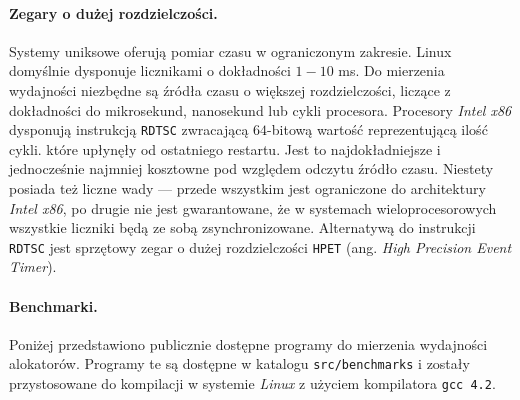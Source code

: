 \documentclass[12pt,a4paper,titlepage,twoside]{mwart}
\begin{document}
\paragraph{Zegary o dużej rozdzielczości.} Systemy uniksowe oferują pomiar
czasu w ograniczonym zakresie. Linux domyślnie dysponuje licznikami o
dokładności $1-10$ ms. Do mierzenia wydajności niezbędne są źródła czasu o
większej rozdzielczości, liczące z dokładności do mikrosekund, nanosekund lub
cykli procesora. Procesory \textit{Intel x86} dysponują instrukcją
\texttt{RDTSC} zwracającą $64$-bitową wartość reprezentującą ilość cykli.
które upłynęły od ostatniego restartu. Jest to najdokładniejsze i jednocześnie
najmniej kosztowne pod względem odczytu źródło czasu. Niestety posiada też
liczne wady --- przede wszystkim jest ograniczone do architektury \textit{Intel
x86}, po drugie nie jest gwarantowane, że w systemach wieloprocesorowych
wszystkie liczniki będą ze sobą zsynchronizowane. Alternatywą do instrukcji
\texttt{RDTSC} jest sprzętowy zegar o dużej rozdzielczości \texttt{HPET} (ang.
\textit{High Precision Event Timer}).

\paragraph{Benchmarki.} Poniżej przedstawiono publicznie dostępne programy do
mierzenia wydajności alokatorów. Programy te są dostępne w katalogu
\texttt{src/benchmarks} i zostały przystosowane do kompilacji w systemie
\textit{Linux} z użyciem kompilatora \texttt{gcc 4.2}.
\end{document}
